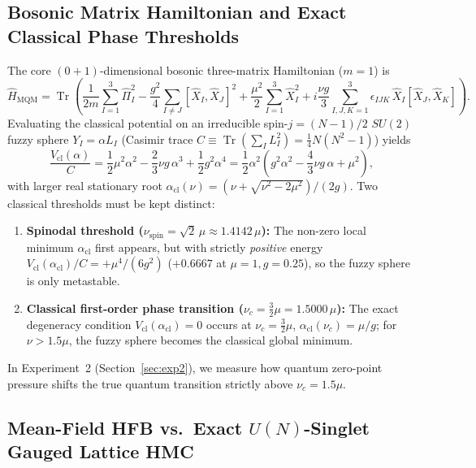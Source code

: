 \documentclass[11pt,a4paper]{article}
\DeclareMathOperator{\Tr}{Tr}
\begin{document}
\subsection{Bosonic Matrix Hamiltonian and Exact Classical Phase Thresholds}
The core $(0+1)$-dimensional bosonic three-matrix Hamiltonian ($m=1$) is
\begin{equation}
  \hat{H}_{\mathrm{MQM}} = \Tr\!\left(
    \frac{1}{2m}\sum_{I=1}^{3} \hat{\Pi}_I^2
    - \frac{g^2}{4}\sum_{I\neq J} [\hat{X}_I, \hat{X}_J]^2
    + \frac{\mu^2}{2}\sum_{I=1}^{3} \hat{X}_I^2
    + i\frac{\nu g}{3}\sum_{I,J,K=1}^{3} \epsilon_{IJK}\,\hat{X}_I[\hat{X}_J,\hat{X}_K]
  \right).
  \label{eq:Hmqm}
\end{equation}
Evaluating the classical potential on an irreducible spin-$j=(N-1)/2$ $SU(2)$ fuzzy sphere $Y_I = \alpha L_I$ (Casimir trace $C \equiv \Tr(\sum_I L_I^2) = \frac{1}{4}N(N^2-1)$) yields
\begin{equation}
  \frac{V_{\mathrm{cl}}(\alpha)}{C}
  = \frac{1}{2}\mu^2\alpha^2 - \frac{2}{3}\nu g\,\alpha^3 + \frac{1}{2}g^2\alpha^4
  = \frac{1}{2}\alpha^2\!\left(g^2\alpha^2 - \frac{4}{3}\nu g\,\alpha + \mu^2\right),
  \label{eq:Vcl_alpha}
\end{equation}
with larger real stationary root $\alpha_{\mathrm{cl}}(\nu) = (\nu + \sqrt{\nu^2 - 2\mu^2})/(2g)$. Two classical thresholds must be kept distinct:
\begin{enumerate}
  \item \textbf{Spinodal threshold ($\nu_{\mathrm{spin}} = \sqrt{2}\,\mu \approx 1.4142\,\mu$):} The non-zero local minimum $\alpha_{\mathrm{cl}}$ first appears, but with strictly \emph{positive} energy $V_{\mathrm{cl}}(\alpha_{\mathrm{cl}})/C = +\mu^4/(6g^2)$ ($+0.6667$ at $\mu=1, g=0.25$), so the fuzzy sphere is only metastable.
  \item \textbf{Classical first-order phase transition ($\nu_c = \frac{3}{2}\mu = 1.5000\,\mu$):} The exact degeneracy condition $V_{\mathrm{cl}}(\alpha_{\mathrm{cl}}) = 0$ occurs at $\nu_c = \frac{3}{2}\mu$, $\alpha_{\mathrm{cl}}(\nu_c) = \mu/g$; for $\nu > 1.5\mu$, the fuzzy sphere becomes the classical global minimum.
\end{enumerate}
In Experiment~2 (Section~\ref{sec:exp2}), we measure how quantum zero-point pressure shifts the true quantum transition strictly above $\nu_c = 1.5\mu$.

\subsection{Mean-Field HFB vs.\ Exact $U(N)$-Singlet Gauged Lattice HMC}
\label{sec:hfb_vs_hmc}
\end{document}
